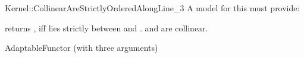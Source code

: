 \begin{ccRefFunctionObjectConcept}{Kernel::CollinearAreStrictlyOrderedAlongLine_3}
A model for this must provide:


         {returns , iff  lies strictly between 
          and . \ccPrecond {} and 
          are collinear.}

\ccRefines
AdaptableFunctor (with three arguments)

\ccSeeAlso

  \\


\end{ccRefFunctionObjectConcept}
